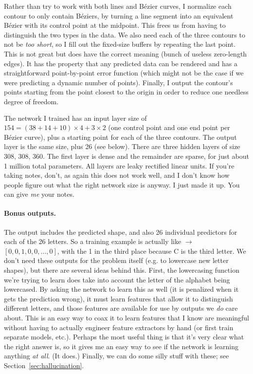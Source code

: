 \documentclass[twocolumn]{amsart}
\begin{document}

Rather than try to work with both lines and B\'ezier curves, I
normalize each contour to only contain B\'eziers, by turning a line
segment into an equivalent B\'ezier with its control point at the
midpoint. This frees us from having to distinguish the two types in
the data. We also need each of the three contours to not be {\em too
  short}, so I fill out the fixed-size buffers by repeating the last
point. This is not great but does have the correct meaning (bunch of
useless zero-length edges). It has the property that any predicted
data can be rendered and has a straightforward point-by-point error
function (which might not be the case if we were predicting a dynamic
number of points). Finally, I output the contour's points starting
from the point closest to the origin in order to reduce one needless
degree of freedom.

The network I trained has an input layer size of $154 = (38 + 14 + 10)
\times 4 + 3 \times 2$ (one control point and one end point per
B\'ezier curve), plus a starting point for each of the three contours.
The output layer is the same size, plus 26 (see below). There are
three hidden layers of size 308, 308, 360. The first layer is dense
and the remainder are sparse,
for just about 1 million total parameters. All layers are leaky
rectified linear units. If you're taking notes, don't, as again this
does not work well, and I don't know how people figure out what the
right network size is anyway. I just made it up. You can give {\em me}
your notes.

\paragraph{Bonus outputs.} The output includes the predicted shape,
and also 26 individual predictors for each of the 26 letters. So a
training example is actually like  $\rightarrow$
 $[0, 0, 1, 0, 0, \ldots, 0]$, with the 1 in the third
place because C is the third letter. We don't need these outputs for
the problem itself (e.g. to lowercase new letter shapes), but there
are several ideas behind this. First, the lowercasing function we're
trying to learn does take into account the letter of the alphabet
being lowercased. By asking the network to learn this as well (it is
penalized when it gets the prediction wrong), it must learn features
that allow it to distinguish different letters, and those features are
available for use by outputs we {\em do} care about. This is an easy
way to coax it to learn features that I know are meaningful without
having to actually engineer feature extractors by hand (or first train
separate models, etc.). Perhaps the most useful thing is that it's
very clear what the right answer is, so it gives me an easy way to see
if the network is learning anything {\em at all}. (It does.) Finally,
we can do some silly stuff with these; see
Section~\ref{sec:hallucination}.
\end{document}

